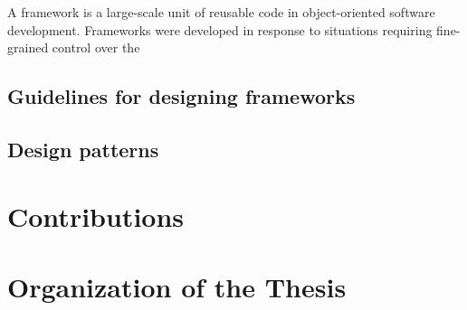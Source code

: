 A framework is a large-scale unit of reusable code in object-oriented
software development.  Frameworks were developed in response to
situations requiring fine-grained control over the

\subsection{Guidelines for designing frameworks}
\subsection{Design patterns}


\section{Contributions}

\section{Organization of the Thesis}